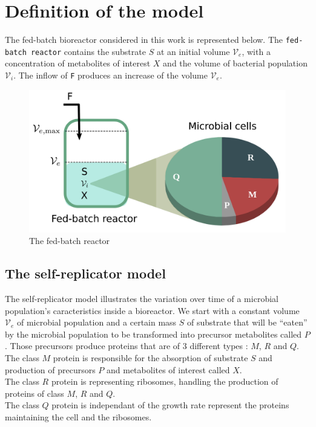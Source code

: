 \documentclass{tudelft-report}
\begin{document}
\chapter{Definition of the model}
\label{chapter:definition}
The fed-batch bioreactor considered in this work is represented below. The \verb|fed-batch reactor| contains the substrate $S$ at an initial volume $\mathcal{V}_e$, with a concentration of metabolites of interest $X$ and the volume of bacterial population $\mathcal{V}_i$. The inflow of \verb|F| produces an increase of the volume $\mathcal{V}_e$.
\begin{figure}[H]
    \centering
    \includegraphics[scale = 0.3]{figures/bioreactorScheme.png}
    \caption*{The fed-batch reactor}
\end{figure}
\section*{The self-replicator model}\noindent
The self-replicator model illustrates the variation over time of a microbial population's caracteristics inside a bioreactor. We start with a constant volume $\mathcal{V}_e$ of microbial population and a certain mass $S$ of substrate that will be ``eaten'' by the microbial population to be transformed into precursor metabolites called $P$. Those precursors produce proteins that are of $3$ different types : $M$, $R$ and $Q$.\\
The class $M$ protein is responsible for the absorption of substrate $S$ and production of precursors $P$ and metabolites of interest called $X$.\\
The class $R$ protein is representing ribosomes, handling the production of proteins of class $M$, $R$ and $Q$.\\
The class $Q$ protein is independant of the growth rate represent the proteins maintaining the cell and the ribosomes.
\end{document}
